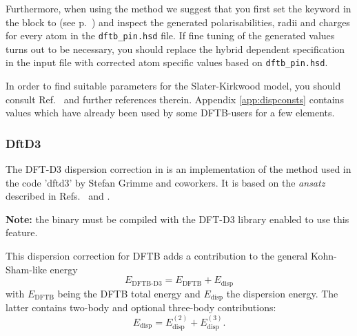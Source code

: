 Furthermore, when using the  method we
suggest that you first set the  keyword in the
 block to  (see p.~) and
inspect the generated polarisabilities, radii and charges for every
atom in the \verb|dftb_pin.hsd| file. If fine tuning of the generated
values turns out to be necessary, you should replace the hybrid
dependent specification in the input file with corrected atom
specific values based on \verb|dftb_pin.hsd|.

In order to find suitable parameters for the Slater-Kirkwood model,
you should consult Ref.~\cite{elstner-jcp-114-5149} and further
references therein. Appendix \ref{app:dispconsts} contains values
which have already been used by some DFTB-users for a few elements.

\subsubsection{DftD3}
\label{sec:dftbp.DftD3}

The DFT-D3 dispersion correction in \dftbp{} is an implementation of the method
used in the code 'dftd3' by Stefan Grimme and coworkers.  It is based on the
{\it ansatz} described in Refs.~\cite{grimme-jcp-132-154104} and
\cite{grimme-jcp-32-1456-1465}.

\textbf{Note:} the \dftbp{} binary must be compiled with the DFT-D3 library
enabled to use this feature.

This dispersion correction for DFTB adds a contribution to the general
Kohn-Sham-like energy
\begin{equation*}
  E_{\text{DFTB-D3}} = E_{\text{DFTB}} + E_{\text{disp}}
\end{equation*}
with $E_{\text{DFTB}}$ being the DFTB total energy and $E_{\text{disp}}$ the
dispersion energy. The latter contains two-body and optional three-body
contributions:
\begin{equation*}
  E_{\text{disp}} = E_{\text{disp}}^{(2)} + E_{\text{disp}}^{(3)}.
\end{equation*}

